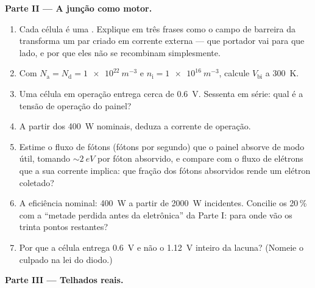 \begin{problem}
\medskip\noindent\textbf{Parte II --- A junção como motor.}

\begin{enumerate}[resume]
  \item Cada célula é uma . Explique em três frases
        como o campo de barreira da  transforma um
        par criado em corrente externa --- que portador vai para que
        lado, e por que eles não se recombinam simplesmente.
  \item Com $N_{\text{a}} = N_{\text{d}} = \qty{1e22}{m^{-3}}$
        e $n_{\text{i}} = \qty{1e16}{m^{-3}}$, calcule
        $V_{\text{bi}}$ a \qty{300}{K}.
  \item Uma célula em operação entrega cerca de \qty{0.6}{V}. Sessenta
        em série: qual é a tensão de operação do painel?
  \item A partir dos \qty{400}{W} nominais, deduza a corrente de
        operação.
  \item Estime o fluxo de fótons (fótons por segundo) que o painel
        absorve de modo útil, tomando $\sim\qty{2}{eV}$ por fóton
        absorvido, e compare com o fluxo de elétrons que a sua corrente
        implica: que fração dos fótons absorvidos rende um
        elétron coletado?
  \item A eficiência nominal: \qty{400}{W} a partir de
        \qty{2000}{W} incidentes. Concilie os 20\,\% com a
        ``metade perdida antes da eletrônica'' da Parte I: para onde vão
        os trinta pontos restantes?
  \item Por que a célula entrega \qty{0.6}{V} e não o
        \qty{1.12}{V} inteiro da lacuna? (Nomeie o culpado na lei do
        diodo.)
\end{enumerate}

\medskip\noindent\textbf{Parte III --- Telhados reais.}


\end{problem}
